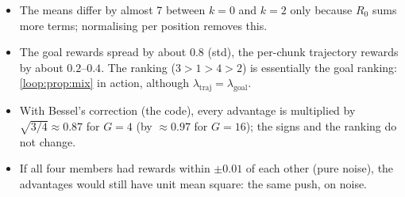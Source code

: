 \begin{itemize}
\item The means differ by almost 7 between $k=0$ and $k=2$ only because $R_0$ sums more terms; normalising per position removes this.
\item The goal rewards spread by about $0.8$ (std), the per-chunk trajectory rewards by about $0.2$--$0.4$. The ranking ($3>1>4>2$) is essentially the goal ranking: \cref{loop:prop:mix} in action, although $\lambda_{\mathrm{traj}}=\lambda_{\mathrm{goal}}$.
\item With Bessel's correction (the code), every advantage is multiplied by $\sqrt{3/4}\approx0.87$ for $G=4$ (by $\approx0.97$ for $G=16$); the signs and the ranking do not change.
\item If all four members had rewards within $\pm0.01$ of each other (pure noise), the advantages would still have unit mean square: the same push, on noise.
\end{itemize}

